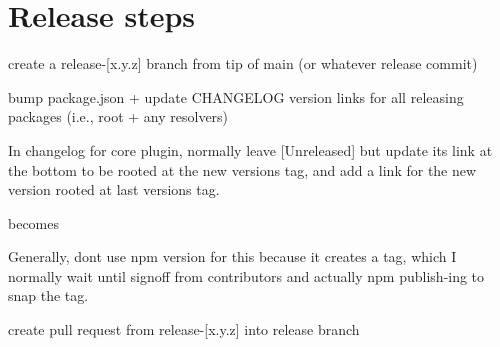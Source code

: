 \chapter{Release steps}
\hypertarget{md_node__modules_2eslint-plugin-import_2RELEASE}{}\label{md_node__modules_2eslint-plugin-import_2RELEASE}
\label{md_node__modules_2eslint-plugin-import_2RELEASE_autotoc_md11145}%
%

\begin{DoxyEnumerate}
\item create a {\ttfamily release-\/\mbox{[}x.\+y.\+z\mbox{]}} branch from tip of {\ttfamily main} (or whatever release commit)


\begin{DoxyCode}{0}

\end{DoxyCode}

\item bump {\ttfamily package.\+json} + update CHANGELOG version links for all releasing packages (i.\+e., root + any resolvers)

In changelog for core plugin, normally leave \mbox{[}Unreleased\mbox{]} but update its link at the bottom to be rooted at the new version\textquotesingle{}s tag, and add a link for the new version rooted at last version\textquotesingle{}s tag.


\begin{DoxyCode}{0}

\end{DoxyCode}


becomes


\begin{DoxyCode}{0}

\end{DoxyCode}


Generally, don\textquotesingle{}t use {\ttfamily npm version} for this because it creates a tag, which I normally wait until signoff from contributors and actually {\ttfamily npm publish}-\/ing to snap the tag.
\item create pull request from {\ttfamily release-\/\mbox{[}x.\+y.\+z\mbox{]}} into {\ttfamily release} branch


\end{DoxyEnumerate}
